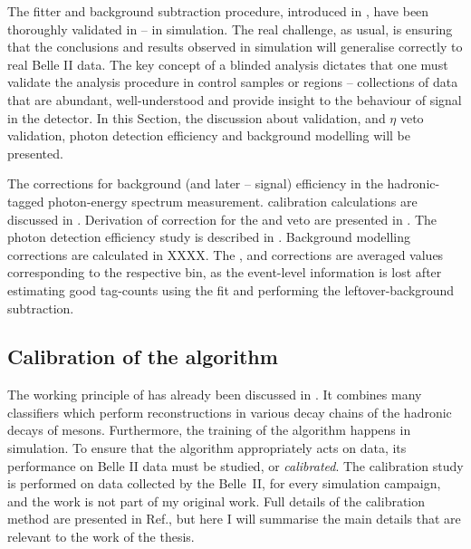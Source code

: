 The fitter and background subtraction procedure, introduced in ,
have been thoroughly validated in  -- in simulation.
The real challenge, as usual, is ensuring that the conclusions and results observed in simulation will generalise correctly to real Belle II data.
The key concept of a blinded analysis dictates that one must validate the analysis procedure in control samples or regions -- collections of data that are abundant, well-understood and provide insight to the behaviour of signal in the detector.
In this Section, the discussion about \FEI validation, \piz and $\eta$ veto validation, photon detection efficiency and background modelling will be presented.

\begin{table}[htbp!]
    \centering
    \caption{\label{tab:correction_table} The corrections for background (and later -- signal) efficiency in the hadronic-tagged \BtoXsgamma photon-energy spectrum measurement.
    \FEI calibration calculations are discussed in .
    Derivation of correction for the \piz and \eta veto are presented in .
    The photon detection efficiency study is described in .
    Background modelling corrections are calculated in XXXX.
    The \FEI, \piz and \gamma corrections are averaged values corresponding to the respective \EB bin,
    as the event-level information is lost after estimating good tag-\B counts using the \Mbc fit and performing the leftover-\BB background subtraction.
    }
    
\end{table}


\subsection{Calibration of the \texorpdfstring{\FEI}{FEI} algorithm}\label{sec:fei_calibration}

The working principle of \FEI has already been discussed in .
It combines many classifiers which perform reconstructions in various decay chains of the hadronic decays of \B mesons.
Furthermore, the training of the algorithm happens in simulation.
To ensure that the algorithm appropriately acts on data, its performance on Belle II data must be studied, or \textit{calibrated}.
The calibration study is performed on data collected by the Belle~II, for every simulation campaign, and the work is not part of my original work.
Full details of the calibration method are presented in Ref.\cite{Belle-II:2020fst}, but here I will summarise the main details that are relevant to the work of the thesis.

